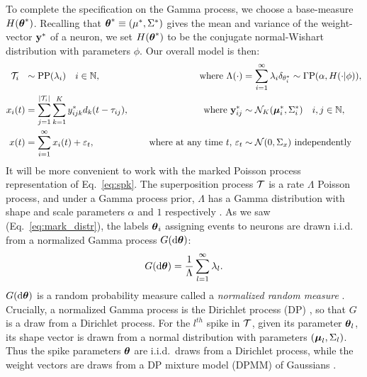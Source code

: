 To complete the specification on the Gamma process, we choose a base-measure $H(\boldsymbol{\theta}^*)$.
Recalling that $\boldsymbol{\theta}^* \equiv (\mu^*, \Sigma^*)$ gives the mean and variance of the weight-vector $\mathbf{y}^*$ of a neuron, we set $H(\boldsymbol{\theta}^*)$ 
to be the conjugate normal-Wishart distribution with parameters $\phi$. Our overall model is then:
\begin{subequations}
\begin{align}
  \mc{T}_i\ \  &\sim \text{PP}(\lambda_i) \quad i \in \NN, \quad &\text{ where } \Lambda(\cdot)&=\sum_{i=1}^{\infty} \lambda_i \delta_{\theta^*_i} \sim \Gamma \text{P}(\alpha, H(\cdot| {\phi})), \\ %
  x_i(t) &= \sum_{j = 1}^{|\mc{T}_i|}  \sum_{k = 1}^{K} y^*_{ijk} d_k(t - \tau_{ij}), \quad &\text{ where }\by^*_{ij}  &\sim \mc{N}_K(\mb{\mu}^*_i, \Sigma^*_i) \quad i,j \in \NN, \\
  x(t)   &= \sum_{i=1}^{\infty} x_i(t) + \eps_t, \quad &\text{ where at any time $t$, } \eps_t &\sim \mc{N}(0,\Sigma_x) \text{ independently}
\end{align}
\end{subequations}
% 
It will be more convenient to work with the marked Poisson process representation of Eq.~\eqref{eq:spk}. %
The superposition process $\mathcal{T}$ is a rate $\Lambda$ Poisson process,
and under a Gamma process prior, $\Lambda$ has a Gamma distribution with shape and scale parameters $\alpha$ and $1$ respectively \citep{Ferguson73}.
As we saw (Eq.~\eqref{eq:mark_distr}), the labels $\boldsymbol{\theta}_i$ assigning events to neurons are drawn i.i.d. from a normalized Gamma 
process $G(\mathrm{d} \boldsymbol{\theta})$:
\vspace{-.2in}
\begin{align}
 G(\mathrm{d} \boldsymbol{\theta}) = \frac{1}{\Lambda} \sum_{l=1}^{\infty} \lambda_l.
\end{align}
$G(\mathrm{d} \boldsymbol{\theta})$ is a random probability measure called a \emph{normalized random measure} \citep{JamesLP09}. Crucially, a 
normalized Gamma process is the Dirichlet process (DP) \citep{Ferguson73}, so that $G$ is a draw from a Dirichlet process. For the $l^{th}$ spike in $\mathcal{T}$, given its 
parameter $\boldsymbol{\theta}_l$, its shape vector is drawn from a normal distribution
with parameters $(\boldsymbol{\mu}_{l}, \Sigma_{l})$. Thus the spike parameters $\boldsymbol{\theta}$ are i.i.d.\ draws from a Dirichlet process, while the weight vectors are
draws from a DP mixture model (DPMM) of Gaussians \citep{Lo1984}.

